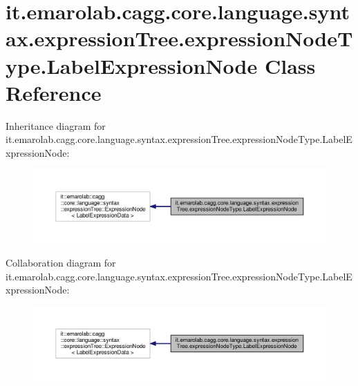 \hypertarget{classit_1_1emarolab_1_1cagg_1_1core_1_1language_1_1syntax_1_1expressionTree_1_1expressionNodeType_1_1LabelExpressionNode}{\section{it.\-emarolab.\-cagg.\-core.\-language.\-syntax.\-expression\-Tree.\-expression\-Node\-Type.\-Label\-Expression\-Node Class Reference}
\label{classit_1_1emarolab_1_1cagg_1_1core_1_1language_1_1syntax_1_1expressionTree_1_1expressionNodeType_1_1LabelExpressionNode}
}


Inheritance diagram for it.\-emarolab.\-cagg.\-core.\-language.\-syntax.\-expression\-Tree.\-expression\-Node\-Type.\-Label\-Expression\-Node\-:\nopagebreak
\begin{figure}[H]
\begin{center}
\leavevmode
\includegraphics[width=350pt]{classit_1_1emarolab_1_1cagg_1_1core_1_1language_1_1syntax_1_1expressionTree_1_1expressionNodeTypd3de7589d5c0c498870521c4108fb040}
\end{center}
\end{figure}


Collaboration diagram for it.\-emarolab.\-cagg.\-core.\-language.\-syntax.\-expression\-Tree.\-expression\-Node\-Type.\-Label\-Expression\-Node\-:\nopagebreak
\begin{figure}[H]
\begin{center}
\leavevmode
\includegraphics[width=350pt]{classit_1_1emarolab_1_1cagg_1_1core_1_1language_1_1syntax_1_1expressionTree_1_1expressionNodeTypb0b6e379465f0f899d3b047e1b909fb2}
\end{center}
\end{figure}
